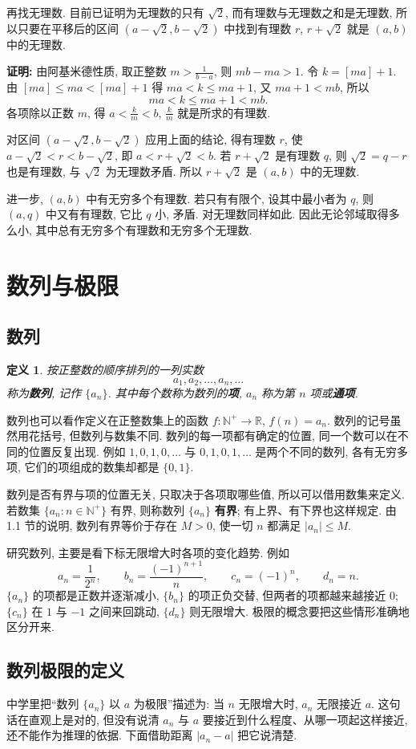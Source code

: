 \documentclass[UTF8,openany]{ctexbook}
\theoremstyle{chinesetextbook}
\newtheorem{definition}{定义}[section]
\newenvironment{cnproof}{\par\indent\textbf{证明:} \ignorespaces}{\par}
\begin{document}
再找无理数. 目前已证明为无理数的只有 $\sqrt2$, 而有理数与无理数之和是无理数, 所以只要在平移后的区间 $(a-\sqrt2,b-\sqrt2)$ 中找到有理数 $r$, $r+\sqrt2$ 就是 $(a,b)$ 中的无理数.
\begin{cnproof}
由阿基米德性质, 取正整数 $\displaystyle m>\frac1{b-a}$, 则 $mb-ma>1$. 令 $k=[ma]+1$. 由 $[ma]\le ma<[ma]+1$ 得 $ma<k\le ma+1$, 又 $ma+1<mb$, 所以
\[
ma<k\le ma+1<mb.
\]
各项除以正数 $m$, 得 $\displaystyle a<\frac km<b$, $\displaystyle\frac km$ 就是所求的有理数.

对区间 $(a-\sqrt2,b-\sqrt2)$ 应用上面的结论, 得有理数 $r$, 使 $a-\sqrt2<r<b-\sqrt2$, 即 $a<r+\sqrt2<b$. 若 $r+\sqrt2$ 是有理数 $q$, 则 $\sqrt2=q-r$ 也是有理数, 与 $\sqrt2$ 为无理数矛盾. 所以 $r+\sqrt2$ 是 $(a,b)$ 中的无理数.
\end{cnproof}
进一步, $(a,b)$ 中有无穷多个有理数. 若只有有限个, 设其中最小者为 $q$, 则 $(a,q)$ 中又有有理数, 它比 $q$ 小, 矛盾. 对无理数同样如此. 因此无论邻域取得多么小, 其中总有无穷多个有理数和无穷多个无理数.
\section{数列与极限}
\subsection{数列}
\begin{definition}
按正整数的顺序排列的一列实数
\[
a_1,a_2,\ldots,a_n,\ldots
\]
称为\textbf{数列}, 记作 $\{a_n\}$. 其中每个数称为数列的\textbf{项}, $a_n$ 称为第 $n$ 项或\textbf{通项}.
\end{definition}
数列也可以看作定义在正整数集上的函数 $f:\mathbb N^+\to\mathbb R$, $f(n)=a_n$. 数列的记号虽然用花括号, 但数列与数集不同. 数列的每一项都有确定的位置, 同一个数可以在不同的位置反复出现. 例如 $1,0,1,0,\ldots$ 与 $0,1,0,1,\ldots$ 是两个不同的数列, 各有无穷多项, 它们的项组成的数集却都是 $\{0,1\}$.

数列是否有界与项的位置无关, 只取决于各项取哪些值, 所以可以借用数集来定义. 若数集 $\{a_n:n\in\mathbb N^+\}$ 有界, 则称数列 $\{a_n\}$ \textbf{有界}; 有上界、有下界也这样规定. 由 1.1 节的说明, 数列有界等价于存在 $M>0$, 使一切 $n$ 都满足 $|a_n|\le M$.

研究数列, 主要是看下标无限增大时各项的变化趋势. 例如
\[
a_n=\frac1{2^n},\qquad b_n=\frac{(-1)^{n+1}}n,\qquad c_n=(-1)^n,\qquad d_n=n.
\]
$\{a_n\}$ 的项都是正数并逐渐减小, $\{b_n\}$ 的项正负交替, 但两者的项都越来越接近 $0$; $\{c_n\}$ 在 $1$ 与 $-1$ 之间来回跳动, $\{d_n\}$ 则无限增大. 极限的概念要把这些情形准确地区分开来.
\subsection{数列极限的定义}
中学里把“数列 $\{a_n\}$ 以 $a$ 为极限”描述为: 当 $n$ 无限增大时, $a_n$ 无限接近 $a$. 这句话在直观上是对的, 但没有说清 $a_n$ 与 $a$ 要接近到什么程度、从哪一项起这样接近, 还不能作为推理的依据. 下面借助距离 $|a_n-a|$ 把它说清楚.
\end{document}
